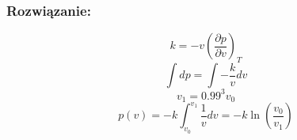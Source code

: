 \subsubsection*{Rozwiązanie:}
\begin{equation}
k = -v \left(\frac{\partial p}{\partial v}\right)_T 
\end{equation}
\begin{equation}
\int dp = \int -\frac{k}{v} dv 
\end{equation}
\begin{equation}
v_1 = 0.99^3 v_0
\end{equation}
\begin{equation}
p(v) = -k \int^{v_1}_{v_0} \frac{1}{v} dv = -k \ln\left( \frac{v_0}{v_1} \right)
\end{equation}
